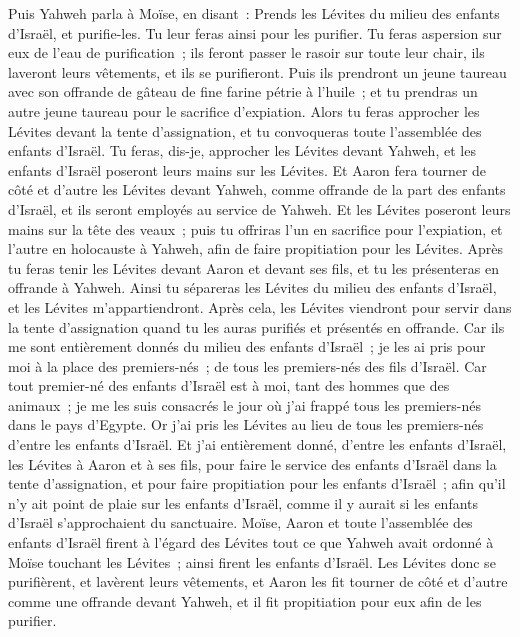 \begin{multicols}{2}
Puis Yahweh parla à Moïse, en disant~:
Prends les Lévites du milieu des enfants d'Israël, et purifie-les.
Tu leur feras ainsi pour les purifier. Tu feras aspersion sur eux de l'eau de purification~; ils feront passer le rasoir sur toute leur chair, ils laveront leurs vêtements, et ils se purifieront.
Puis ils prendront un jeune taureau avec son offrande de gâteau de fine farine pétrie à l'huile~; et tu prendras un autre jeune taureau pour le sacrifice d'expiation.
Alors tu feras approcher les Lévites devant la tente d'assignation, et tu convoqueras toute l'assemblée des enfants d'Israël.
Tu feras, dis-je, approcher les Lévites devant Yahweh, et les enfants d'Israël poseront leurs mains sur les Lévites.
Et Aaron fera tourner de côté et d'autre les Lévites devant Yahweh, comme offrande de la part des enfants d'Israël, et ils seront employés au service de Yahweh.
Et les Lévites poseront leurs mains sur la tête des veaux~; puis tu offriras l'un en sacrifice pour l'expiation, et l'autre en holocauste à Yahweh, afin de faire propitiation pour les Lévites.
Après tu feras tenir les Lévites devant Aaron et devant ses fils, et tu les présenteras en offrande à Yahweh.
Ainsi tu sépareras les Lévites du milieu des enfants d'Israël, et les Lévites m'appartiendront.
Après cela, les Lévites viendront pour servir dans la tente d'assignation quand tu les auras purifiés et présentés en offrande.
Car ils me sont entièrement donnés du milieu des enfants d'Israël~; je les ai pris pour moi à la place des premiers-nés~; de tous les premiers-nés des fils d'Israël.
Car tout premier-né des enfants d'Israël est à moi, tant des hommes que des animaux~; je me les suis consacrés le jour où j'ai frappé tous les premiers-nés dans le pays d'Egypte.
Or j'ai pris les Lévites au lieu de tous les premiers-nés d'entre les enfants d'Israël.
Et j'ai entièrement donné, d'entre les enfants d'Israël, les Lévites à Aaron et à ses fils, pour faire le service des enfants d'Israël dans la tente d'assignation, et pour faire propitiation pour les enfants d'Israël~; afin qu'il n'y ait point de plaie sur les enfants d'Israël, comme il y aurait si les enfants d'Israël s'approchaient du sanctuaire.
Moïse, Aaron et toute l'assemblée des enfants d'Israël firent à l'égard des Lévites tout ce que Yahweh avait ordonné à Moïse touchant les Lévites~; ainsi firent les enfants d'Israël.
Les Lévites donc se purifièrent, et lavèrent leurs vêtements, et Aaron les fit tourner de côté et d'autre comme une offrande devant Yahweh, et il fit propitiation pour eux afin de les purifier.

\end{multicols}
